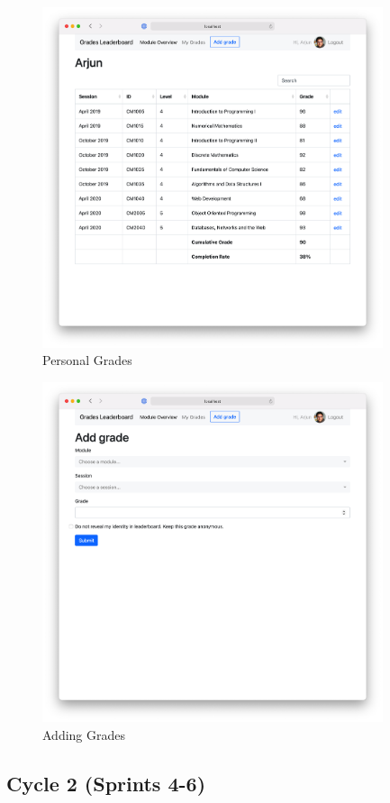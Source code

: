 \begin{figure}[H]
    \centering
    \includegraphics[width=10cm]{images/personal.png}
    \caption{Personal Grades}
    \label{fig:personal}
\end{figure}

\begin{figure}[H]
    \centering
    \includegraphics[width=10cm]{images/addgrade.png}
    \caption{Adding Grades}
    \label{fig:addgrade}
\end{figure}



\subsection{Cycle 2 (Sprints 4-6)}




